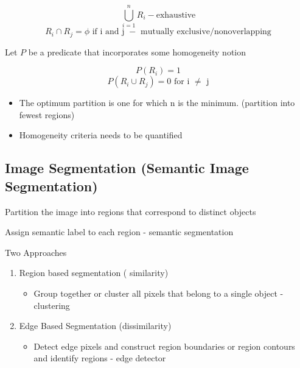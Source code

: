 \documentclass[11pt]{article}
\theoremstyle{definition}
\begin{document}
\begin{shaded}
    \begin{equation}
        \bigcup_{i=1}^{n} R_i - \text{exhaustive}
    \end{equation}
    \begin{equation}
        R_i \cap R_j = \phi \text{ if i and j } -\text{ mutually exclusive/nonoverlapping}
    \end{equation}
\end{shaded}
    
Let $P$ be a predicate that incorporates some homogeneity notion

\begin{shaded}
    \begin{equation}
        P(R_i) = 1 
    \end{equation}
    \begin{equation}
        P(R_i \cup R_j) = 0 \text{ for i } \neq \text{ j}  
    \end{equation}
\end{shaded}

\begin{itemize}
    \item The optimum partition is one for which n is the minimum. (partition into fewest regions) 
    \item Homogeneity criteria needs to be quantified
\end{itemize}


    
\subsection{Image Segmentation (Semantic Image Segmentation)}
Partition the image into regions that correspond to distinct objects

Assign semantic label to each region - semantic segmentation

Two Approaches
\begin{enumerate}
    \item Region based segmentation ( similarity)
    \begin{itemize}
        \item Group together or cluster all pixels that belong to a single object - clustering
    \end{itemize}
    \item Edge Based Segmentation (dissimilarity)
    \begin{itemize}
        \item Detect edge pixels and construct region boundaries or region contours and identify regions - edge detector
    \end{itemize}
\end{enumerate}
\end{document}
